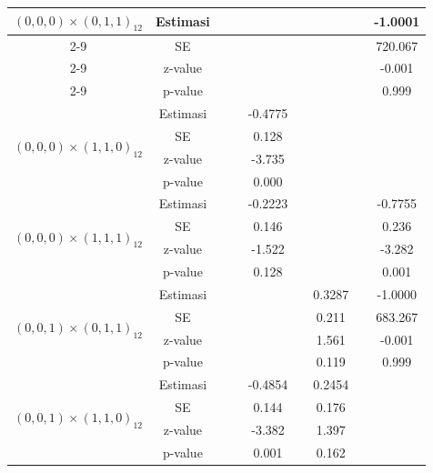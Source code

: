\begin{enumerate}[label=\alph*.]
\begin{longtable}{|c|c|c|c|c|c|c|c|c|}
            \multirow{4}{*}{$(0,0,0)\times(0,1,1)_{12}$}
            & Estimasi & {} & {} & {} & {} & {} & {} & -1.0001 \\ \cline{2-9}
            & SE       & {} & {} & {} & {} & {} & {} & 720.067\\ \cline{2-9}
            & z-value  &  {}   & {} & {} & {} & {} & {} & -0.001 \\ \cline{2-9}
            & p-value  & {} & {} & {} & {} & {} & {} & 0.999 \\ \hline

            \multirow{4}{*}{$(0,0,0)\times(1,1,0)_{12}$}
            & Estimasi & {} & {} & -0.4775 & {} & {} & {} & {} \\ \cline{2-9}
            & SE       & {} & {} & 0.128 & {} & {} & {} & {}\\ \cline{2-9}
            & z-value  & {} & {} & -3.735 & {} & {} & {} & {}\\ \cline{2-9}
            & p-value  & {} & {} & 0.000 & {} & {} & {} & {}\\ \hline

            \multirow{4}{*}{$(0,0,0)\times(1,1,1)_{12}$}
            & Estimasi & {} & {} & -0.2223 & {} & {} & {} & -0.7755\\ \cline{2-9}
            & SE       & {} & {} & 0.146 & {} & {} & {} & 0.236\\ \cline{2-9}
            & z-value  & {} & {} & -1.522 & {}   & {}   & {} & -3.282\\ \cline{2-9}
            & p-value  & {} & {} & 0.128 & {} & {} & {} & 0.001\\ \hline

            \multirow{4}{*}{$(0,0,1)\times(0,1,1)_{12}$}
            & Estimasi & {} & {} & {} & {} & 0.3287 & {} & -1.0000 \\ \cline{2-9}
            & SE       & {} & {} & {} & {} & 0.211 & {} & 683.267\\ \cline{2-9}
            & z-value  & {} & {} & {} & {} & 1.561 & {} & -0.001\\ \cline{2-9}
            & p-value  & {} & {} & {} & {} & 0.119 & {} & 0.999\\ \hline

            \multirow{4}{*}{$(0,0,1)\times(1,1,0)_{12}$}
            & Estimasi & {} & {} & -0.4854 & {}  & 0.2454 & {} & {}\\ \cline{2-9}
            & SE       & {} & {} & 0.144 & {} & 0.176 & {} & {}\\ \cline{2-9}
            & z-value  & {} & {} & -3.382 & {} & 1.397 & {} & {}\\ \cline{2-9}
            & p-value  & {} & {} & 0.001 & {} & 0.162 & {} & {} \\ \hline


\end{longtable}
\end{enumerate}
